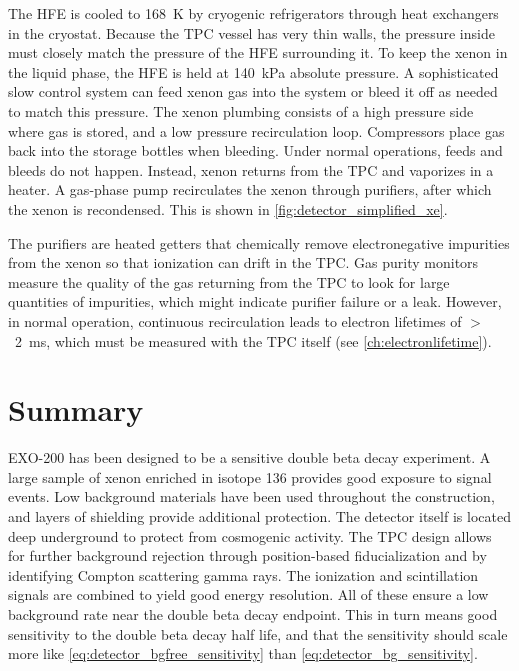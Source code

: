 \documentclass[herrin-thesis.tex]{subfiles}
\begin{document}
The HFE is cooled to \SI{168}{\K} by cryogenic refrigerators through heat exchangers in the cryostat. Because the TPC vessel has very thin walls, the pressure inside must closely match the pressure of the HFE surrounding it. To keep the xenon in the liquid phase, the HFE is held at \about{}\SI{140}{\kilo\Pa} absolute pressure. A sophisticated slow control system can feed xenon gas into the system or bleed it off as needed to match this pressure. The xenon plumbing consists of a high pressure side where gas is stored, and a low pressure recirculation loop. Compressors place gas back into the storage bottles when bleeding. Under normal operations, feeds and bleeds do not happen. Instead, xenon returns from the TPC and vaporizes in a heater. A gas-phase pump \cite{LePort:2011fk} recirculates the xenon through purifiers, after which the xenon is recondensed. This is shown in \cref{fig:detector_simplified_xe}. 

The purifiers are heated  getters \cite{SAESgetters} that chemically remove electronegative impurities from the xenon so that ionization can drift in the TPC. Gas purity monitors \cite{Dobi:2011zr} measure the quality of the gas returning from the TPC to look for large quantities of impurities, which might indicate purifier failure or a leak. However, in normal operation, continuous recirculation leads to electron lifetimes of \(>\)~\SI{2}{\ms}, which must be measured with the TPC itself  (see \cref{ch:electronlifetime}).

\section{Summary}
EXO-200 has been designed to be a sensitive double beta decay experiment. A large sample of xenon enriched in isotope 136 provides good exposure to signal events. Low background materials have been used throughout the construction, and layers of shielding provide additional protection. The detector itself is located deep underground to protect from cosmogenic activity. The TPC design allows for further background rejection through position-based fiducialization and by identifying Compton scattering gamma rays. The ionization and scintillation signals are combined to yield good energy resolution. All of these ensure a low background rate near the double beta decay endpoint. This in turn means good sensitivity to the double beta decay half life, and that the sensitivity should scale more like \cref{eq:detector_bgfree_sensitivity} than \cref{eq:detector_bg_sensitivity}.
\end{document}
